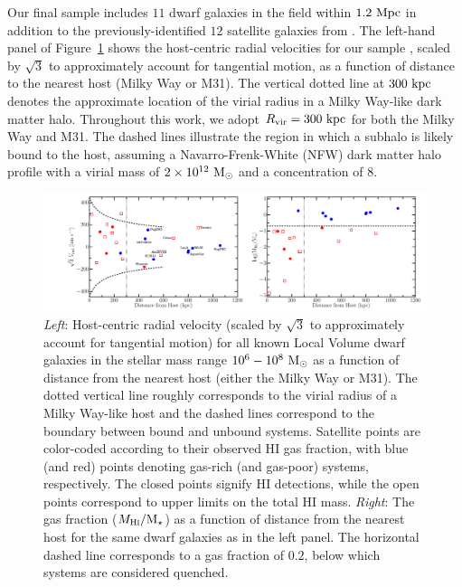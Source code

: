 Our final sample includes $11$ dwarf galaxies in the field within
$1.2~{\rm Mpc}$ in addition to the previously-identified $12$
satellite galaxies from \citet{fham15}.
%
The left-hand panel of Figure~\ref{fig:LVdwarfs} shows the host-centric
radial velocities for our sample \citep{mcconnachie12, tollerud12,
  makarova17}, scaled by $\sqrt{3}$ to approximately account for
tangential motion, as a function of distance to the nearest host
(Milky Way or M31). 
%
The vertical dotted line at $300~{\rm kpc}$ denotes the approximate location of
the virial radius in a Milky Way-like dark matter halo. Throughout this work, we
adopt $R_{\rm{vir}} = 300~{\rm kpc}$ for both the Milky Way and M31.
%
The dashed lines illustrate the region in which a subhalo is likely
bound to the host, assuming a Navarro-Frenk-White (NFW) dark matter
halo profile \citep{nfw97} with a virial mass of $2\times
10^{12}~{\rm M}_{\odot}$ and a concentration of $8$. 
%


\begin{figure}
 \centering
 \hspace*{-0.3in}
 \includegraphics[width=6.5in]{fieldquench/fig1.pdf}
 \caption[Local Volume phase space and H{\scriptsize I} gas fractions]{{\it Left}: Host-centric radial velocity (scaled by
   $\sqrt{3}$ to approximately account for tangential motion) for all
   known Local Volume dwarf galaxies in the stellar mass range
   $10^{6}-10^{8}~{\rm M}_{\odot}$ as a function of distance from the nearest
   host (either the Milky Way or M31). The dotted vertical line
   roughly corresponds to the virial radius of a Milky Way-like host
   and the dashed lines correspond to the boundary between bound and
   unbound systems. Satellite points are color-coded according to
   their observed H{\scriptsize I} gas fraction, with blue (and red)
   points denoting gas-rich (and gas-poor) systems, respectively. 
   The closed points signify H{\scriptsize I} detections, while the
   open points correspond to upper limits on the 
   total H{\scriptsize I} mass. {\it Right}: The gas fraction
   ($M_{\rm H\protect\scalebox{0.55}{\rm I}}/\mstar$) as a function of distance
   from the nearest host for the same dwarf galaxies as in the left
   panel. The horizontal dashed line corresponds to a gas fraction of
   $0.2$, below which systems are considered quenched.}
 \label{fig:LVdwarfs}
\end{figure}

